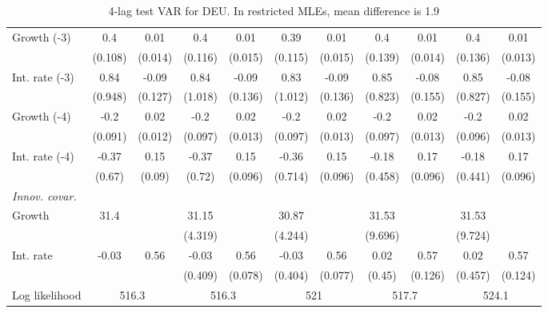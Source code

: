 \begin{table}[htbp]
\begin{tabular}{@{\extracolsep{4pt}}lcccccccccc@{}}
\quad Growth (-3) 	 &0.4 	 & 0.01 	 & 0.4 	 & 0.01 	 & 0.39 	 & 0.01 	 & 0.4 	 & 0.01 	 & 0.4 	 & 0.01	 \\ 
 		 & (0.108) 	 & (0.014) 	 & (0.116) 	 & (0.015) 	 & (0.115) 	 & (0.015) 	 & (0.139) 	 & (0.014) 	 & (0.136) 	 & (0.013) 	 \\ 
\quad Int. rate (-3) 	 &0.84 	 & -0.09 	 & 0.84 	 & -0.09 	 & 0.83 	 & -0.09 	 & 0.85 	 & -0.08 	 & 0.85 	 & -0.08	 \\ 
 		 & (0.948) 	 & (0.127) 	 & (1.018) 	 & (0.136) 	 & (1.012) 	 & (0.136) 	 & (0.823) 	 & (0.155) 	 & (0.827) 	 & (0.155) 	 \\ 
\quad Growth (-4) 	 &-0.2 	 & 0.02 	 & -0.2 	 & 0.02 	 & -0.2 	 & 0.02 	 & -0.2 	 & 0.02 	 & -0.2 	 & 0.02	 \\ 
 		 & (0.091) 	 & (0.012) 	 & (0.097) 	 & (0.013) 	 & (0.097) 	 & (0.013) 	 & (0.097) 	 & (0.013) 	 & (0.096) 	 & (0.013) 	 \\ 
\quad Int. rate (-4) 	 &-0.37 	 & 0.15 	 & -0.37 	 & 0.15 	 & -0.36 	 & 0.15 	 & -0.18 	 & 0.17 	 & -0.18 	 & 0.17	 \\ 
 		 & (0.67) 	 & (0.09) 	 & (0.72) 	 & (0.096) 	 & (0.714) 	 & (0.096) 	 & (0.458) 	 & (0.096) 	 & (0.441) 	 & (0.096) 	 \\ 
\rule{0pt}{4ex} \emph{Innov. covar.}  	 & 	 & 	 & 	 & 	 & 	 & 	 & 	 & 	 & 	 &\\ 
\quad Growth 	 &31.4 	 &  	 & 31.15 	 &  	 & 30.87 	 &  	 & 31.53 	 &  	 & 31.53 	 & 	 \\ 
 		 &  	 &  	 & (4.319) 	 &  	 & (4.244) 	 &  	 & (9.696) 	 &  	 & (9.724) 	 &  	 \\ 
\quad Int. rate 	 &-0.03 	 & 0.56 	 & -0.03 	 & 0.56 	 & -0.03 	 & 0.56 	 & 0.02 	 & 0.57 	 & 0.02 	 & 0.57	 \\ 
 		 &  	 &  	 & (0.409) 	 & (0.078) 	 & (0.404) 	 & (0.077) 	 & (0.45) 	 & (0.126) 	 & (0.457) 	 & (0.124) 	 \\ 
 \hline \rule{0pt}{4ex} 
  Log likelihood 	 &\multicolumn{2}{c}{516.3} 	 & \multicolumn{2}{c}{516.3} 	 & \multicolumn{2}{c}{521} 	 & \multicolumn{2}{c}{517.7} 	 & \multicolumn{2}{c}{524.1}\\ 

 \hline 	\end{tabular}		\caption{4-lag test VAR for DEU. In restricted MLEs, mean difference is 1.9}
		\label{tab:DEU4}

\end{table}